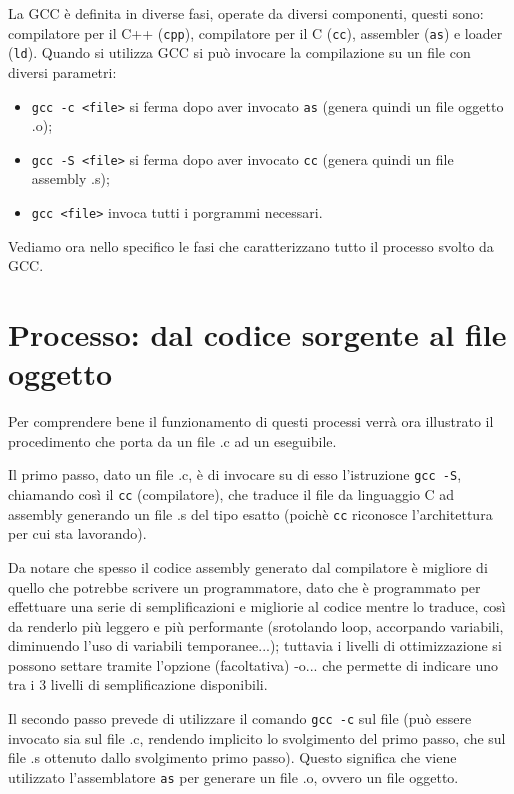 \documentclass[class=book, crop=false, oneside]{standalone}
\begin{document}
La GCC è definita in diverse fasi, operate da diversi componenti, questi sono: compilatore per il C++ (\texttt{cpp}), compilatore per il C (\texttt{cc}), assembler (\texttt{as}) e loader (\texttt{ld}).
Quando si utilizza GCC si può invocare la compilazione su un file con diversi parametri:
\begin{itemize}
	\item \texttt{gcc -c <file>} si ferma dopo aver invocato \texttt{as} (genera quindi un file oggetto .o);
	\item \texttt{gcc -S <file>} si ferma dopo aver invocato \texttt{cc} (genera quindi un file assembly .s);
	\item \texttt{gcc <file>} invoca tutti i porgrammi necessari.
\end{itemize}
Vediamo ora nello specifico le fasi che caratterizzano tutto il processo svolto da GCC.

\section{Processo: dal codice sorgente al file oggetto}
Per comprendere bene il funzionamento di questi processi verrà ora illustrato il procedimento che porta da un file .c ad un eseguibile.

Il primo passo, dato un file .c, è di invocare su di esso l'istruzione \texttt{gcc -S}, chiamando così il \texttt{cc} (compilatore), che traduce il file da linguaggio C ad assembly generando un file .s del tipo esatto (poichè \texttt{cc} riconosce l'architettura per cui sta lavorando).

Da notare che spesso il codice assembly generato dal compilatore è migliore di quello che potrebbe scrivere un programmatore, dato che è programmato per effettuare una serie di semplificazioni e migliorie al codice mentre lo traduce, così da renderlo più leggero e più performante (srotolando loop, accorpando variabili, diminuendo l'uso di variabili temporanee...); tuttavia i livelli di ottimizzazione si possono settare tramite l'opzione (facoltativa) -o... che permette di indicare uno tra i 3 livelli di semplificazione disponibili.

Il secondo passo prevede di utilizzare il comando \texttt{gcc -c} sul file (può essere invocato sia sul file .c, rendendo implicito lo svolgimento del primo passo, che sul file .s ottenuto dallo svolgimento primo passo). Questo significa che viene utilizzato l'assemblatore \texttt{as} per generare un file .o, ovvero un file oggetto.
\end{document}
